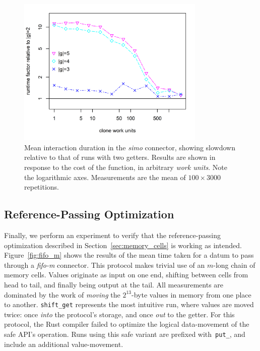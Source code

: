 \begin{figure}
	\centering
	\includegraphics[width=0.80\textwidth]{experiments/simo_2.png}
	\caption[Interaction duration in proportion to the 2-getter case.]{Mean interaction duration in the \textit{simo} connector, showing slowdown relative to that of runs with two getters. Results are shown in response to the cost of the  function, in arbitrary \textit{work units}. Note the logarithmic axes. Measurements are the mean of $100\times{}3000$ repetitions.}
	\label{fig:simo_2}
\end{figure}

\subsection{Reference-Passing Optimization}
Finally, we perform an experiment to verify that the reference-passing optimization described in Section~\ref{sec:memory_cells} is working as intended. Figure~\ref{fig:fifo_m} shows the results of the mean time taken for a datum to pass through a \textit{fifo-m} connector. This protocol makes trivial use of an $m$-long chain of memory cells. Values originate as input on one end, shifting between cells from head to tail, and finally being output at the tail. All measurements are dominated by the work of \textit{moving} the $2^{13}$-byte values in memory from one place to another. \texttt{shift\_get} represents the most intuitive run, where values are moved twice: once \textit{into} the protocol's storage, and once \textit{out} to the getter. For this protocol, the Rust compiler failed to optimize the logical data-movement of the safe API's  operation. Runs using this safe variant are prefixed with~\texttt{put\_}, and include an additional value-movement.

